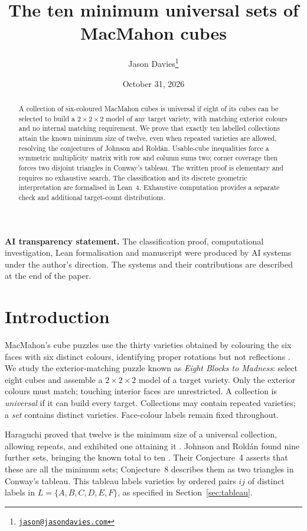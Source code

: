 \documentclass[11pt]{article}
\title{The ten minimum universal sets of MacMahon cubes}
\author{Jason Davies\thanks{\href{mailto:jason@jasondavies.com}{\nolinkurl{jason@jasondavies.com}}}}
\date{October 31, 2026}
\begin{document}
\maketitle
\begin{abstract}
A collection of six-coloured MacMahon cubes is universal if eight of its
cubes can be selected to build a $2\times2\times2$ model of any target
variety, with matching exterior colours and no internal matching requirement.
We prove that exactly ten labelled collections attain the known minimum
size of twelve, even when repeated varieties are allowed, resolving the
conjectures of Johnson and Rold\'an. Usable-cube inequalities force a
symmetric multiplicity matrix with row and column sums two; corner coverage
then forces two disjoint triangles in Conway's tableau. The written proof
is elementary and requires no exhaustive search. The classification and its
discrete geometric interpretation are formalised in Lean~4. Exhaustive
computation provides a separate check and additional target-count
distributions.
\end{abstract}

\noindent\textbf{AI transparency statement.} The classification proof,
computational investigation, Lean formalisation and manuscript were produced
by AI systems under the author's direction. The systems and their
contributions are described at the end of the paper.

\section{Introduction}
MacMahon's cube puzzles use the thirty varieties obtained by colouring the
six faces with six distinct colours, identifying proper rotations but not
reflections \cite[pp.~42--46]{MacMahon}. We study the exterior-matching
puzzle known as \emph{Eight Blocks to Madness}: select eight cubes and
assemble a $2\times2\times2$ model of a target variety. Only the exterior
colours must match; touching interior faces are unrestricted.
A collection is \emph{universal} if it can build every target.
Collections may contain repeated varieties; a \emph{set} contains distinct
varieties. Face-colour labels remain fixed throughout.

Haraguchi proved that twelve is the minimum size of a universal collection,
allowing repeats, and exhibited one attaining it
\cite[Lemma~2 and Theorem~4]{H}. Johnson and Rold\'an found nine further
sets, bringing the known total to ten \cite[Theorem~3]{JR}. Their Conjecture~4 asserts that these are all the
minimum sets; Conjecture~8 describes them as two triangles in Conway's
tableau. This tableau labels varieties by ordered pairs $ij$ of distinct
labels in $L=\{A,B,C,D,E,F\}$, as specified in Section~\ref{sec:tableau}.
\end{document}
